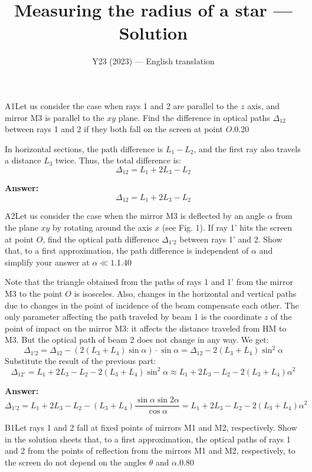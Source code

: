 \documentclass[11pt,a4paper]{article}
\title{\textbf{Measuring the radius of a star --- Solution}}
\author{\normalsize Y23 (2023) — English translation}
\date{}
\begin{document}
\maketitle\vspace{-0.5em}
\begin{solcard}{A1}{Let us consider the case when rays 1 and 2 are parallel to the $z$ axis, and mirror M3 is parallel to the $xy$ plane. Find the difference in optical paths $\Delta_{12}$ between rays 1 and 2 if they both fall on the screen at point $O$.}{0.20}

In horizontal sections, the path difference is $L_1 - L_2$, and the first ray also travels a distance $L_3$ twice. Thus, the total difference is: $$\Delta_{12} = L_1+2L_3-L_2$$

\par\smallskip\noindent\textbf{Answer:} \[\Delta_{12}=L_1+2L_3-L_2\]
\end{solcard}

\begin{solcard}{A2}{Let us consider the case when the mirror M3 is deflected by an angle $\alpha$ from the plane $xy$ by rotating around the axis $x$ (see Fig. 1). If ray 1' hits the screen at point $O$, find the optical path difference $\Delta_{1'2}$ between rays 1' and 2. Show that, to a first approximation, the path difference is independent of $\alpha$ and simplify your answer at $\alpha\ll1$.}{1.40}

Note that the triangle obtained from the paths of rays 1 and 1' from the mirror M3 to the point $O$ is isosceles. Also, changes in the horizontal and vertical paths due to changes in the point of incidence of the beam compensate each other. The only parameter affecting the path traveled by beam 1 is the coordinate $z$ of the point of impact on the mirror M3: it affects the distance traveled from HM to M3. But the optical path of beam 2 does not change in any way. We get: $$\Delta_{1'2} = \Delta_{12} - \left(2(L_3+L_4)\sin{\alpha}\right)\cdot \sin{\alpha} = \Delta_{12} - 2(L_3+L_4)\sin^2{\alpha}$$Substitute the result of the previous part: $$\Delta_{12'} = L_1+2L_3-L_2 - 2(L_3+L_4)\sin^2{\alpha} \approx L_1+2L_3-L_2 - 2(L_3+L_4)\alpha^2$$

\par\smallskip\noindent\textbf{Answer:} \[\Delta_{1'2}=L_1+2L_3-L_2-(L_3+L_4)\frac{\sin\alpha\sin2\alpha}{\cos\alpha}=L_1+2L_3-L_2-2(L_3+L_4)\alpha^2\]
\end{solcard}

\begin{solcard}{B1}{Let rays 1 and 2 fall at fixed points of mirrors M1 and M2, respectively. Show in the solution sheets that, to a first approximation, the optical paths of rays 1 and 2 from the points of reflection from the mirrors M1 and M2, respectively, to the screen do not depend on the angles $\theta$ and $\alpha$.}{0.80}
\end{solcard}
\end{document}

